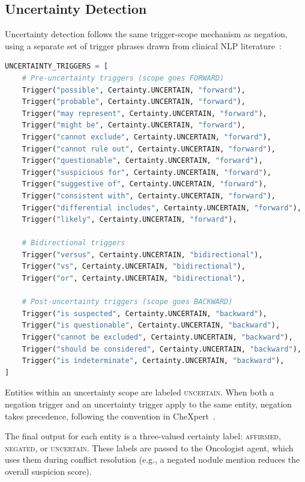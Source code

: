 \documentclass[12pt]{article}
\begin{document}
\subsection{Uncertainty Detection}
\label{subsec:uncertainty-detection}

Uncertainty detection follows the same trigger-scope mechanism as negation, using a separate set of trigger phrases drawn from clinical NLP literature~\cite{irvin2019chexpert, harkema2009context}:

\begin{lstlisting}[language=Python, caption={Uncertainty trigger phrases (ConText-based).}]
UNCERTAINTY_TRIGGERS = [
    # Pre-uncertainty triggers (scope goes FORWARD)
    Trigger("possible", Certainty.UNCERTAIN, "forward"),
    Trigger("probable", Certainty.UNCERTAIN, "forward"),
    Trigger("may represent", Certainty.UNCERTAIN, "forward"),
    Trigger("might be", Certainty.UNCERTAIN, "forward"),
    Trigger("cannot exclude", Certainty.UNCERTAIN, "forward"),
    Trigger("cannot rule out", Certainty.UNCERTAIN, "forward"),
    Trigger("questionable", Certainty.UNCERTAIN, "forward"),
    Trigger("suspicious for", Certainty.UNCERTAIN, "forward"),
    Trigger("suggestive of", Certainty.UNCERTAIN, "forward"),
    Trigger("consistent with", Certainty.UNCERTAIN, "forward"),
    Trigger("differential includes", Certainty.UNCERTAIN, "forward"),
    Trigger("likely", Certainty.UNCERTAIN, "forward"),
    
    # Bidirectional triggers
    Trigger("versus", Certainty.UNCERTAIN, "bidirectional"),
    Trigger("vs", Certainty.UNCERTAIN, "bidirectional"),
    Trigger("or", Certainty.UNCERTAIN, "bidirectional"),
    
    # Post-uncertainty triggers (scope goes BACKWARD)
    Trigger("is suspected", Certainty.UNCERTAIN, "backward"),
    Trigger("is questionable", Certainty.UNCERTAIN, "backward"),
    Trigger("cannot be excluded", Certainty.UNCERTAIN, "backward"),
    Trigger("should be considered", Certainty.UNCERTAIN, "backward"),
    Trigger("is indeterminate", Certainty.UNCERTAIN, "backward"),
]
\end{lstlisting}

Entities within an uncertainty scope are labeled \textsc{uncertain}. When both a negation trigger and an uncertainty trigger apply to the same entity, negation takes precedence, following the convention in CheXpert~\cite{irvin2019chexpert}.

The final output for each entity is a three-valued certainty label: \textsc{affirmed}, \textsc{negated}, or \textsc{uncertain}. These labels are passed to the Oncologist agent, which uses them during conflict resolution (e.g., a negated nodule mention reduces the overall suspicion score).
\end{document}
